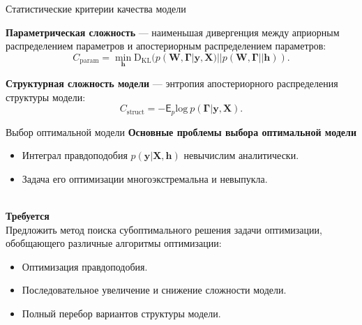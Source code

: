 \documentclass[usenames,dvipsnames,10pt,pdf,utf8,russian,aspectratio=43]{beamer}
\begin{document}
\begin{frame}{Статистические критерии качества модели}


\textbf{Параметрическая сложность} --- наименьшая дивергенция между априорным распределением параметров и апостериорным распределением параметров:
\[
    C_\text{param} = \min_{\mathbf{h}} \text{D}_\text{KL}(p(\mathbf{W}, \boldsymbol{\Gamma}|\mathbf{y}, \mathbf{X})||p(\mathbf{W}, \boldsymbol{\Gamma}||\mathbf{h})).
\]



\textbf{Структурная сложность модели} --- энтропия апостериорного распределения структуры модели:
\[
    C_\text{struct} = -\mathsf{E}_{p} \text{log}~p(\boldsymbol{\Gamma}|\mathbf{y}, \mathbf{X}).
\]

\end{frame}


\begin{frame}{Выбор оптимальной модели}
\textbf{Основные проблемы выбора оптимальной модели}\\
\begin{itemize}
\item Интеграл правдоподобия $p(\mathbf{y}|\mathbf{X}, \mathbf{h})$ невычислим аналитически.
\item Задача его оптимизации многоэкстремальна и невыпукла.
\end{itemize}
~\\
\textbf{Требуется}\\ 
Предложить метод поиска субоптимального решения задачи оптимизации, обобщающего различные алгоритмы оптимизации:
\begin{itemize}
\item Оптимизация правдоподобия.
\item Последовательное увеличение и снижение сложности модели.
\item Полный перебор вариантов структуры модели.
\end{itemize}

\end{frame} 
   
\end{document}
